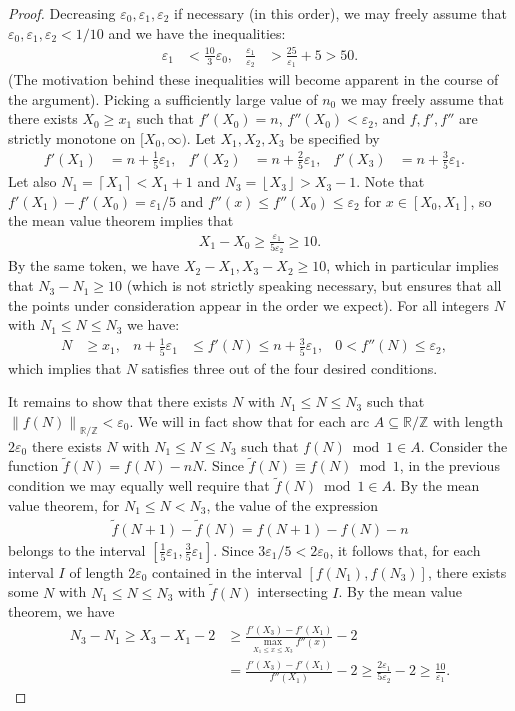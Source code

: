 \documentclass[10pt,a4paper]{amsart}
\newcommand{\RR}{\mathbb{R}}
\newcommand{\ZZ}{\mathbb{Z}}
\newcommand{\ceil}[1]{\left\lceil #1 \right\rceil}
\newcommand{\e}{\varepsilon}
\newcommand{\floor}[1]{\left\lfloor #1 \right\rfloor}
\newcommand{\fpa}[1]{\left\lVert #1 \right\rVert_{\RR/\ZZ}}
\renewcommand{\subset}{\subseteq}
\begin{document}
\begin{proof}
	Decreasing $\e_0,\e_1,\e_2$ if necessary (in this order), we may freely assume that $\e_0,\e_1,\e_2 < 1/10$ and we have the inequalities:
\begin{align*}
	\e_1 &< \frac{10}{3} \e_0,&
	\frac{\e_1}{\e_2} &> \frac{25}{\e_1} + 5 > 50.
\end{align*}
(The motivation behind these inequalities will become apparent in the course of the argument). Picking a sufficiently large value of $n_0$ we may freely assume that there exists $X_0 \geq x_1$ such that $f'(X_0) = n$, $f''(X_0) < \e_2$, and $f,f',f''$ are strictly monotone on $[X_0,\infty)$. Let $X_1,X_2,X_3$ be specified by
	\begin{align*}
	f'(X_1) &= n + \frac{1}{5} \e_1,&
	f'(X_2) &= n + \frac{2}{5} \e_1,&
	f'(X_3) &= n + \frac{3}{5} \e_1.&	
	\end{align*}
	Let also $N_1 = \ceil{X_1} < X_1 + 1$ and $N_3 = \floor{X_3} > X_3 - 1$. 
	Note that $f'(X_1) - f'(X_0) = \e_1/5$ and $f''(x) \leq f''(X_0) \leq \e_2$ for $x \in [X_0,X_1]$, so the mean value theorem implies that
	\begin{align*}
	X_1 - X_0 \geq  \frac{\e_1}{5\e_2} \geq 10.
	\end{align*}		
	By the same token, we have $X_2-X_1, X_3-X_2 \geq 10$, which in particular implies that $N_3-N_1 \geq 10$ (which is not strictly speaking necessary, but ensures that all the points under consideration appear in the order we expect). 	
	For all integers $N$ with $N_1 \leq N \leq N_3$ we have:
\begin{align*}
N &\geq x_1,&
n+\frac{1}{5}\e_1 &\leq f'(N) \leq n+\frac{3}{5}\e_1,&
0 < f''(N) \leq \e_2,&
\end{align*}	
which implies that $N$ satisfies three out of the four desired conditions.

It remains to show that there exists $N$ with $N_1 \leq N \leq N_3$ such that $\fpa{f(N)} < \e_0$. We will in fact show that for each arc $A \subset \RR/\ZZ$ with length $2\e_0$ there exists $N$ with $N_1 \leq N \leq N_3$ such that $f(N) \bmod 1 \in A$. Consider the function $\tilde f(N) = f(N) - nN$. Since $\tilde f(N) \equiv f(N) \bmod 1$, in the previous condition we may equally well require that $\tilde f(N) \bmod 1 \in A$. By the mean value theorem, for $N_1 \leq N < N_3$, the value of the expression 
\begin{align*}
	\tilde f(N+1) - \tilde f(N) = f(N+1) - f(N) - n 
\end{align*}
belongs to the interval $\left[\frac{1}{5} \e_1, \frac{3}{5} \e_1 \right]$.
Since $3\e_1/5 < 2\e_0$, it follows that, for each interval $I$ of length $2\e_0$ contained in the interval $[f(N_1),f(N_3)]$, there exists some $N$ with $N_1 \leq N \leq N_3$ with $\tilde f(N)$ intersecting $I$. By the mean value theorem, we have 
\begin{align*}
	N_3 - N_1 \geq X_3 - X_1 - 2 &\geq 
	\frac{f'(X_3) - f'(X_1)}{\max_{X_1 \leq x \leq X_3} f''(x) } - 2 \\
	&= \frac{f'(X_3) - f'(X_1)}{ f''(X_1) } - 2 \geq  \frac{2\e_1}{5\e_2} - 2 \geq \frac{10}{\e_1}.
\end{align*}
 

\end{proof}
\end{document}
